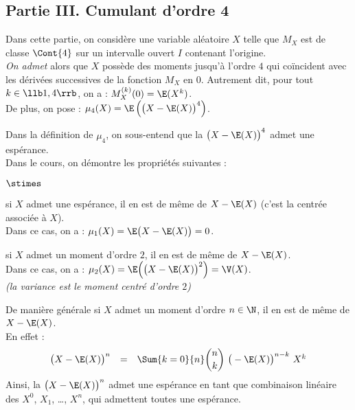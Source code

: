 \documentclass[11pt]{article}%
\begin{document}
\newpage


\subsection*{Partie III. Cumulant d'ordre 4}

\noindent
Dans cette partie, on considère une variable aléatoire $X$ telle que
$M_X$ est de classe $\Cont{4}$ sur un intervalle ouvert $I$ contenant
l'origine.\\
{\it On admet} alors que $X$ possède des moments jusqu'à l'ordre $4$
qui coïncident avec les dérivées successives de la fonction $M_X$ en
$0$. Autrement dit, pour tout $k \in \llb 1,4 \rrb$, on a :
$M_X^{(k)}(0) = \E(X^k)$.\\[.1cm]
De plus, on pose : $\mu_4(X) = \E\left( \big(X - \E(X)\big)^4
\right)$.
\begin{remarkL}{.98}%
  Dans la définition de $\mu_4$, on sous-entend que la \var $\big(X -
  \E(X)\big)^4$ admet une espérance.\\
  Dans le cours, on démontre les propriétés suivantes :
  \begin{noliste}{$\stimes$}
  \item si $X$ admet une espérance, il en est de même de $X - \E(X)$
    (c'est la \var centrée associée à $X$).\\
    Dans ce cas, on a : $\mu_1(X) = \E\big( X - \E(X) \big) = 0$.

  \item si $X$ admet un moment d'ordre $2$, il en est de même de $X -
    \E(X)$.\\
    Dans ce cas, on a : $\mu_2(X) = \E\Big( \big(X - \E(X) \big)^2
    \Big) = \V(X)$.\\
    {\it (la variance est le moment centré d'ordre $2$)}
  \end{noliste}
  De manière générale si $X$ admet un moment d'ordre $n \in \N$, il en
  est de même de $X - \E(X)$.\\
  En effet :
  \[
  \begin{array}{rcl}
    \big( X - \E(X) \big)^n & = & \Sum{k=0}{n} \dbinom{n}{k} \ \big( -
    \E(X) \big)^{n-k} \ X^k 
  \end{array}
  \]
  Ainsi, la \var $\big( X - \E(X) \big)^n$ admet une espérance en tant
  que combinaison linéaire des \var $X^0$, $X_1$, \ldots, $X^n$, qui
  admettent toutes une espérance. 
\end{remarkL}
\end{document}
